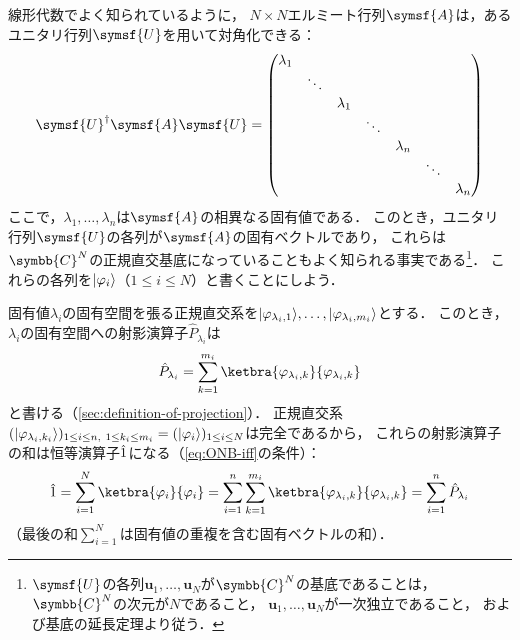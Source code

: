 \documentclass[
]{sotsu}
\begin{document}
線形代数でよく知られているように，
$N \times N$エルミート行列$\symsf{A}$は，あるユニタリ行列$\symsf{U}$を用いて対角化できる：
\begin{equation}
    \label{eq:diagonalize-of-Hermitian}
    \adjoint{\symsf{U}} \symsf{A} \symsf{U}
        = 
        \begin{pmatrix}
            \lambda_1  \\
            & \ddots  \\
            & & \lambda_1  \\
            & & & \ddots  \\
            & & & & \lambda_n  \\
            & & & & & \ddots  \\
            & & & & & & \lambda_n
        \end{pmatrix}
\end{equation}
ここで，$\lambda_1, \dots, \lambda_n$は$\symsf{A}$の相異なる固有値である．
このとき，ユニタリ行列$\symsf{U}$の各列が$\symsf{A}$の固有ベクトルであり，
これらは$\symbb{C}^N$の正規直交基底になっていることもよく知られる事実である\footnote{
    $\symsf{U}$の各列$\symbf{u}_1, \dots, \symbf{u}_N$が$\symbb{C}^N$の基底であることは，
    $\symbb{C}^N$の次元が$N$であること，
    $\symbf{u}_1, \dots, \symbf{u}_N$が一次独立であること，
    および基底の延長定理より従う．
}．
これらの各列を$\lvert\varphi_i\rangle$（$1 \leq i \leq N$）と書くことにしよう．

固有値$\lambda_i$の固有空間を張る正規直交系を$\lvert\varphi_{\lambda_i, 1}\rangle, \dots, \lvert\varphi_{\lambda_i, m_i}\rangle$とする．
このとき，$\lambda_i$の固有空間への射影演算子$\hat{P}_{\lambda_i}$は
\begin{equation*}
    \hat{P}_{\lambda_i} = 
        \sum_{k = 1}^{m_i} \ketbra{\varphi_{\lambda_i, k}}{\varphi_{\lambda_i, k}}
\end{equation*}
と書ける（\cref{sec:definition-of-projection}）．
正規直交系\(
    \sequ{\ket{\varphi_{\lambda_i, k_i}}}[1 \leq i \leq n, \  1 \leq k_i \leq m_i]
    = \sequ{\ket{\varphi_i}}[1 \leq i \leq N]
\)は完全であるから，
これらの射影演算子の和は恒等演算子$\hat{1}$になる（\cref{eq:ONB-iff}の条件）：
\begin{equation}
    \idop 
    = \sum_{i = 1}^{N} \ketbra{\varphi_i}{\varphi_i}
    = \sum_{i = 1}^{n} \sum_{k = 1}^{m_i} \ketbra{\varphi_{\lambda_i, k}}{\varphi_{\lambda_i, k}}
    = \sum_{i = 1}^{n} \hat{P}_{\lambda_i}
\end{equation}
（最後の和$\sum_{i = 1}^{N}$は固有値の重複を含む固有ベクトルの和）．
\end{document}
